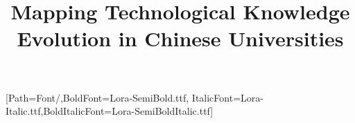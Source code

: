 \usepackage{graphicx,caption,array,tabularx,longtable,booktabs,multirow}
\usepackage{ragged2e,changepage,quoting,enumitem,setspace}
\usepackage{amsmath,amssymb,mathtools}
\usepackage{fontspec}
\setmainfont{Lora-Regular.ttf}[Path=Font/,BoldFont=Lora-SemiBold.ttf,
 ItalicFont=Lora-Italic.ttf,BoldItalicFont=Lora-SemiBoldItalic.ttf]
\usepackage{tikz}
\usetikzlibrary{arrows.meta,positioning,fit,calc,backgrounds}
\usepackage{float,placeins}
\usepackage{xurl}
\usepackage[colorlinks=true,linkcolor=blue,citecolor=black,urlcolor=blue,
 pdftitle={Mapping Technological Knowledge Evolution in Chinese Universities},pdfauthor={}]{hyperref}
\providecommand\IfDocumentMetadataT[1]{}
\providecommand\IfDocumentMetadataF[1]{#1}
\providecommand\IfDocumentMetadataTF[2]{#2}
\usepackage[backend=biber,style=apa,natbib=true]{biblatex}

\AtBeginBibliography{\setlength{\itemsep}{1\baselineskip}}
\usepackage{fancyhdr}
\pagestyle{fancy}\fancyhf{}
\renewcommand{\headrulewidth}{0pt}\renewcommand{\footrulewidth}{0pt}
\setcounter{secnumdepth}{0}
\setlength{\parindent}{0pt}
\setlength{\emergencystretch}{2em}
\newenvironment{blockquote}{\vspace{1em}\begin{adjustwidth}{5em}{0em}\justifying\setlength{\parindent}{0pt}\normalsize}{\end{adjustwidth}\vspace{1em}}
\usepackage{titling}
\title{\textcolor{darkforestgreen}{Mapping Technological Knowledge Evolution in Chinese Universities}}
\newenvironment{structuredabstract}{\section*{Abstract}}{}

